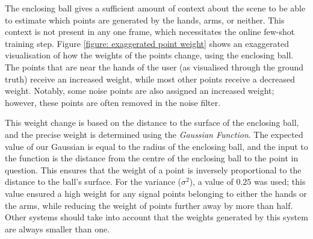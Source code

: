The enclosing ball gives a sufficient amount of context about the scene to be able to estimate which points are generated by the hands, arms, or neither.
This context is not present in any one frame, which necessitates the online few-shot training step.
Figure \ref{figure: exaggerated point weight} shows an exaggerated visualisation of how the weights of the points change, using the enclosing ball.
The points that are near the hands of the user (as visualised through the ground truth) receive an increased weight, while most other points receive a decreased weight.
Notably, some noise points are also assigned an increased weight; however, these points are often removed in the noise filter.

This weight change is based on the distance to the surface of the enclosing ball, and the precise weight is determined using the \textit{Gaussian Function}.
The expected value of our Gaussian is equal to the radius of the enclosing ball, and the input to the function is the distance from the centre of the enclosing ball to the point in question.
This ensures that the weight of a point is inversely proportional to the distance to the ball's surface.
For the variance ($\sigma^2$), a value of $0.25$ was used; this value ensured a high weight for any signal points belonging to either the hands or the arms, while reducing the weight of points further away by more than half.
Other systems should take into account that the weights generated by this system are always smaller than one.


